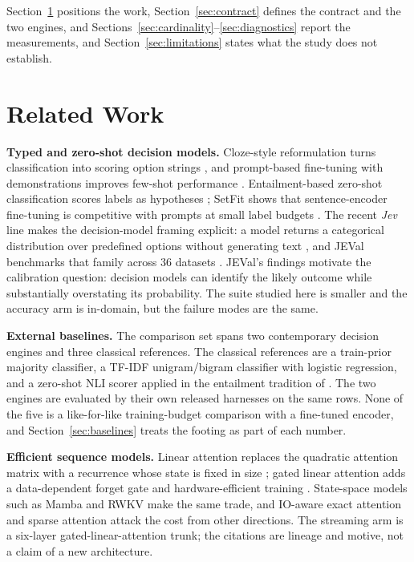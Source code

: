Section~\ref{sec:related} positions the work, Section~\ref{sec:contract} defines the contract and
the two engines, and Sections~\ref{sec:cardinality}--\ref{sec:diagnostics} report the
measurements, and Section~\ref{sec:limitations} states what the study does not establish.

\section{Related Work}
\label{sec:related}

\textbf{Typed and zero-shot decision models.}
Cloze-style reformulation turns classification into scoring option strings
\cite{schick2021pet}, and prompt-based fine-tuning with demonstrations improves few-shot
performance \cite{gao2021lmbff}. Entailment-based zero-shot classification scores labels as
hypotheses \cite{yin2019benchmarking}; SetFit shows that sentence-encoder fine-tuning is
competitive with prompts at small label budgets \cite{tunstall2022setfit}. The recent \emph{Jev}
line makes the decision-model framing explicit: a model returns a categorical distribution over
predefined options without generating text \cite{li2026jev}, and JEVal benchmarks that family
across 36 datasets \cite{duan2026gdm}. JEVal's findings motivate the calibration question:
decision models can identify the likely outcome while substantially overstating its probability.
The suite studied here is smaller and the accuracy arm is in-domain, but the failure modes are
the same.

\textbf{External baselines.}
The comparison set spans two contemporary decision engines and three classical references. The
classical references are a train-prior majority classifier, a TF-IDF unigram/bigram classifier
with logistic regression, and a zero-shot NLI scorer applied in the entailment tradition of
\cite{yin2019benchmarking}. The two engines are evaluated by their own released harnesses on the
same rows. None of the five is a like-for-like training-budget comparison with a fine-tuned
encoder, and Section~\ref{sec:baselines} treats the footing as part of each number.

\textbf{Efficient sequence models.}
Linear attention replaces the quadratic attention matrix with a recurrence whose state is fixed
in size \cite{katharopoulos2020transformers}; gated linear attention adds a data-dependent forget
gate and hardware-efficient training \cite{yang2024gla}. State-space models such as Mamba
\cite{gu2024mamba} and RWKV \cite{peng2023rwkv} make the same trade, and IO-aware exact attention
\cite{dao2022flashattention} and sparse attention \cite{beltagy2020longformer} attack the cost
from other directions. The streaming arm is a six-layer gated-linear-attention trunk; the
citations are lineage and motive, not a claim of a new architecture.

